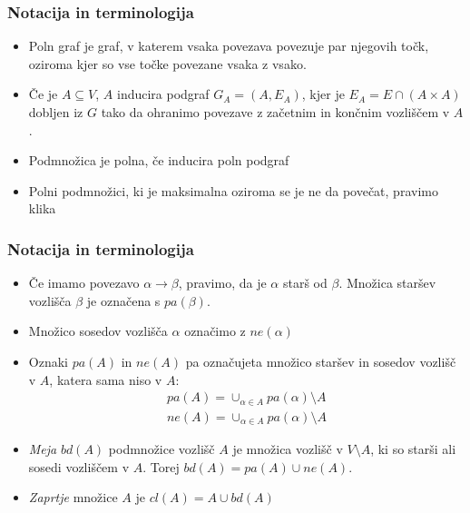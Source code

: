 \documentclass{beamer}
\begin{document}
\begin{frame}
    \frametitle{Notacija in terminologija}
    \begin{itemize}
        \item Poln graf je graf, v katerem vsaka povezava povezuje par njegovih točk,
        oziroma kjer so vse točke povezane vsaka z vsako.
        \item  Če je $A \subseteq V$, $A$ inducira podgraf $G_A = (A, E_A)$,
        kjer je $E_A = E \cap (A \times A)$ dobljen iz $G$ tako da ohranimo povezave z 
        začetnim in končnim vozliščem v $A$.
        \item Podmnožica je polna, če inducira poln podgraf
        \item Polni podmnožici, ki je maksimalna oziroma se je ne da povečat, pravimo klika
   
    \end{itemize}

\end{frame}
\begin{frame}
    \frametitle{Notacija in terminologija}
    \begin{itemize}
        \item Če imamo povezavo $ \alpha \longrightarrow \beta $, pravimo, da je $\alpha$ starš od $\beta$.
        Množica staršev vozlišča $\beta$ je označena s $pa(\beta)$.  
        \item Množico sosedov vozlišča $\alpha$ označimo z $ne(\alpha)$
        \item Oznaki $pa(A)$ in $ne(A)$ pa označujeta množico staršev in sosedov vozlišč v $A$,
        katera sama niso v $A$:
        \begin{align*}
              pa(A) = \cup_{\alpha \in A} pa(\alpha) \setminus A \\
              ne(A) = \cup_{\alpha \in A} pa(\alpha) \setminus A
        \end{align*}
        \item \emph{Meja} $bd(A)$ podmnožice vozlišč $A$ je množica vozlišč v $ V \setminus A $,
        ki so starši ali sosedi vozliščem v $A$. Torej $ bd(A) = pa(A) \cup ne(A)$. 
        \item \emph{Zaprtje} množice $A$ je $cl(A) = A \cup bd(A) $
    \end{itemize}

\end{frame}


\end{document}
